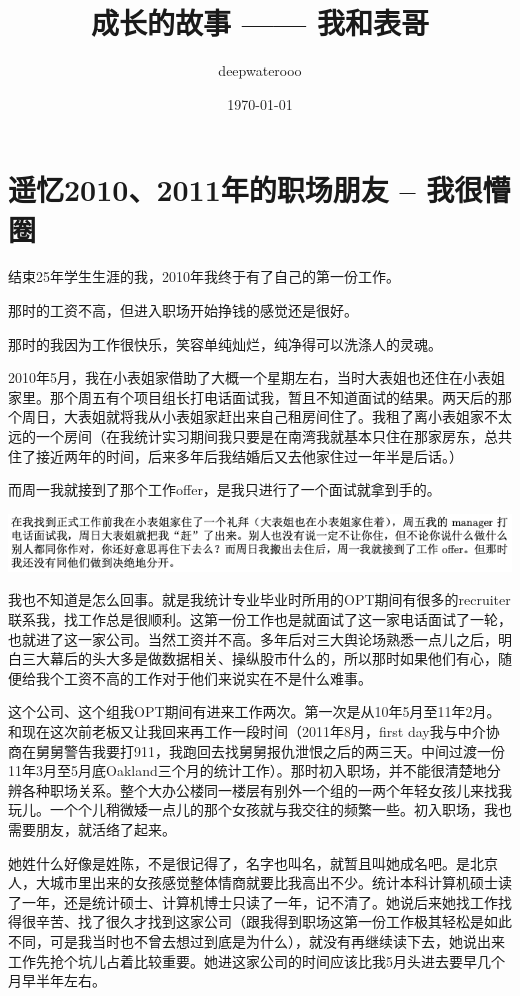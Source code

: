 \documentclass[9pt, b5paper]{article}
\author{deepwaterooo}
\date{\today}
\title{成长的故事 —— 我和表哥}
\begin{document}
\maketitle
\tableofcontents

\section{遥忆2010、2011年的职场朋友 -- 我很懵圈}
\label{sec:org3fe767b}

结束25年学生生涯的我，2010年我终于有了自己的第一份工作。

那时的工资不高，但进入职场开始挣钱的感觉还是很好。 

那时的我因为工作很快乐，笑容单纯灿烂，纯净得可以洗涤人的灵魂。

2010年5月，我在小表姐家借助了大概一个星期左右，当时大表姐也还住在小表姐家里。那个周五有个项目组长打电话面试我，暂且不知道面试的结果。两天后的那个周日，大表姐就将我从小表姐家赶出来自己租房间住了。我租了离小表姐家不太远的一个房间（在我统计实习期间我只要是在南湾我就基本只住在那家房东，总共住了接近两年的时间，后来多年后我结婚后又去他家住过一年半是后话。）

而周一我就接到了那个工作offer，是我只进行了一个面试就拿到手的。

\begin{center}
\includegraphics[width=.9\linewidth]{./pic/p1p47-3.png}
\end{center}

我也不知道是怎么回事。就是我统计专业毕业时所用的OPT期间有很多的recruiter联系我，找工作总是很顺利。这第一份工作也是就面试了这一家电话面试了一轮，也就进了这一家公司。当然工资并不高。多年后对三大舆论场熟悉一点儿之后，明白三大幕后的头大多是做数据相关、操纵股巿什么的，所以那时如果他们有心，随便给我个工资不高的工作对于他们来说实在不是什么难事。 

这个公司、这个组我OPT期间有进来工作两次。第一次是从10年5月至11年2月。和现在这次前老板又让我回来再工作一段时间（2011年8月，first day我与中介协商在舅舅警告我要打911，我跑回去找舅舅报仇泄恨之后的两三天。中间过渡一份11年3月至5月底Oakland三个月的统计工作）。那时初入职场，并不能很清楚地分辨各种职场关系。整个大办公楼同一楼层有别外一个组的一两个年轻女孩儿来找我玩儿。一个个儿稍微矮一点儿的那个女孩就与我交往的频繁一些。初入职场，我也需要朋友，就活络了起来。

她姓什么好像是姓陈，不是很记得了，名字也叫名，就暂且叫她成名吧。是北京人，大城市里出来的女孩感觉整体情商就要比我高出不少。统计本科计算机硕士读了一年，还是统计硕士、计算机博士只读了一年，记不清了。她说后来她找工作找得很辛苦、找了很久才找到这家公司（跟我得到职场这第一份工作极其轻松是如此不同，可是我当时也不曾去想过到底是为什么），就没有再继续读下去，她说出来工作先抢个坑儿占着比较重要。她进这家公司的时间应该比我5月头进去要早几个月早半年左右。
\end{document}
